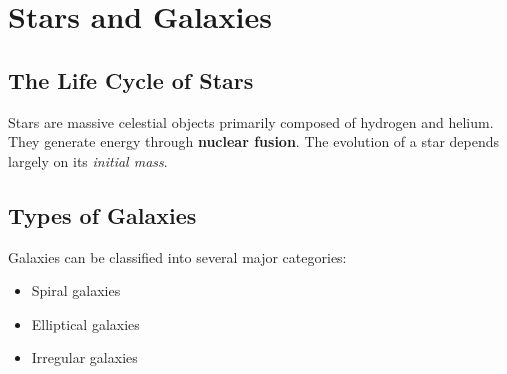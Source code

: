 \section{Stars and Galaxies}
\subsection{The Life Cycle of Stars}
Stars are massive celestial objects primarily composed of hydrogen and helium. They generate energy through \textbf{nuclear fusion}. The evolution of a star depends largely on its \textit{initial mass}.

\subsection{Types of Galaxies}
Galaxies can be classified into several major categories:
\begin{itemize}
    \item Spiral galaxies
    \item Elliptical galaxies
    \item Irregular galaxies

\end{itemize}